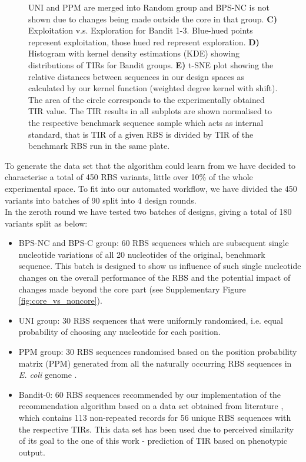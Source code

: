 \documentclass{article}
\newcommand{\mengyan}[1]{\textcolor{magenta}{#1}}
\begin{document}
\begin{figure}[!ht]
{    UNI and PPM are merged into Random group and BPS-NC is not shown due to changes being made outside the core in that group. 
    \textbf{C)} Exploitation v.s. Exploration for Bandit 1-3. Blue-hued points represent exploitation, those hued red represent exploration. 
    \textbf{D)} Histogram with kernel density estimations (KDE) showing distributions of TIRs for Bandit groups.
    \textbf{E)} t-SNE plot showing the relative distances between sequences in our design spaces as calculated by our kernel function (weighted degree kernel with shift). 
    The area of the circle corresponds to the experimentally obtained TIR value.
    The TIR results in all subplots are shown normalised to the respective benchmark sequence sample which acts as internal standard, that is TIR of a given RBS is divided by TIR of the benchmark RBS run in the same plate. }
    \label{fig: Swarmplot and Quantplot}
\end{figure}

To generate the data set that the algorithm could learn from we have decided to characterise a total of 450 RBS variants, little over 10\% of the whole experimental space. 
To fit into our automated workflow, we have divided the 450 variants into batches of 90 split into 4 design rounds.\\

In the zeroth round we have tested two batches of designs, giving a total of 180 variants split as below: 

\begin{itemize}
    \item BPS-NC and BPS-C group: 60 RBS sequences which are subsequent single nucleotide variations of all 20 nucleotides of the original, benchmark sequence. This batch is designed to show us influence of such single nucleotide changes on the overall performance of the RBS and the potential impact of changes made beyond the core part (see Supplementary Figure \ref{fig:core_vs_noncore}).
    \item UNI group: 30 RBS sequences that were  uniformly randomised, i.e. equal probability of choosing any nucleotide for each position. 
    \item PPM group: 30 RBS sequences randomised based on the position probability matrix (PPM) generated from all the naturally occurring RBS sequences in \emph{E. coli} genome \cite{barrick1994quantitative}.
    \item Bandit-0: 60 RBS sequences recommended by our implementation of the recommendation algorithm based on a data set obtained from literature \cite{jervis2018machine}, which contains 113 non-repeated records for 56 unique RBS sequences with the respective TIRs.
    This data set has been used due to perceived similarity of its goal to the one of this work - prediction of TIR based on phenotypic output.
\end{itemize}
\end{document}
